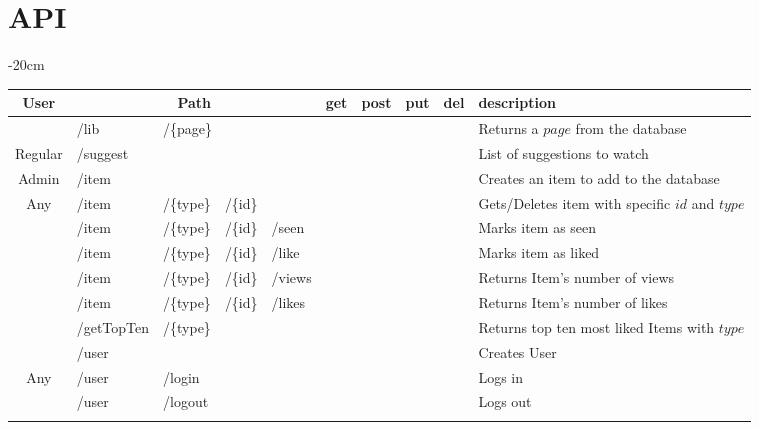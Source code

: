 \documentclass[oneside]{article}
\newcommand{\xmark}{\ding{53}} %
\begin{document}
\section{API}
\label{sec:api}
\begin{table}[H]
  \centering
  \addtolength{\leftskip} {-20cm}
  \addtolength{\rightskip}{-20cm}
  \begin{adjustbox}{width=1.6\textwidth}
  \begin{tabular}{ c|l l l l|c|c|c|c|l }
    \rowcolor{Gray}
    User & \multicolumn{4}{c|}{Path} & get & post & put & del & description 
    \\ \hline
    & /lib & \multicolumn{3}{l|}{/\{page\}} &
    \xmark & & & &
    Returns a $page$ from the database
    \\
    \multirow{-2}{*}{Regular} & 
    \multicolumn{4}{l|}{/suggest} &
     & \xmark & & &
    List of suggestions to watch
    \\ \hhline{-|----|-|-|-|-|~} \rowcolor{Gray}
    Admin & /item & & & &
    & \xmark & & &
    Creates an item to add to the database
    \\ \hhline{-|----|-|-|-|-|~}
    Any &
    /item & /\{type\} & /\{id\} & &
    \xmark & & & \xmark &
    Gets/Deletes item with specific $id$ and $type$ 
    \\ \hhline{-|----|-|-|-|-|~} \rowcolor{Gray}
    & /item & /\{type\} & /\{id\} & /seen &
    & & \xmark & &
    Marks item as seen
    \\ \rowcolor{Gray}
    \multirow{-2}{*}{Regular}
    & /item & /\{type\} & /\{id\} & /like &
    & & \xmark & &
    Marks item as liked
    \\ \hhline{-|----|-|-|-|-|~}
    & /item & /\{type\} & /\{id\} & /views &
    \xmark & & & &
    Returns Item's number of views
    \\
    & /item & /\{type\} & /\{id\} & /likes &
    \xmark & & & &
    Returns Item's number of likes
    \\ 
    & /getTopTen & /\{type\} &  &  &
    \xmark & & & &
    Returns top ten most liked Items with $type$
    \\ 
    & \multicolumn{4}{l|}{/user} &
    & \xmark & & &
    Creates User
    \\
    \multirow{-5}{*}{Any} 
    & /user & \multicolumn{3}{l|}{/login} &
    \xmark & & & &
    Logs in
    \\ \hhline{-|----|-|-|-|-|~} \rowcolor{Gray}
    & /user & \multicolumn{3}{l|}{/logout} &
    \xmark & & & &
    Logs out
    \\ \rowcolor{Gray}

\end{tabular}
\end{adjustbox}
\end{table}
\end{document}
